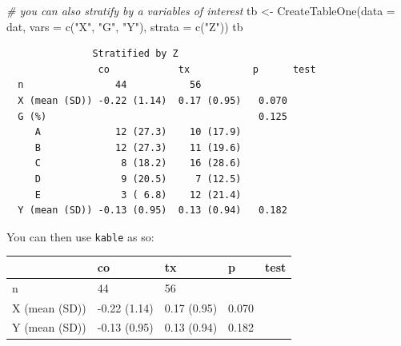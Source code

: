 \documentclass[
  letterpaper,
  DIV=11,
  numbers=noendperiod]{scrreprt}
\newenvironment{Shaded}{\begin{snugshade}}{\end{snugshade}}
\newcommand{\AttributeTok}[1]{\textcolor[rgb]{0.49,0.56,0.16}{#1}}
\newcommand{\CommentTok}[1]{\textcolor[rgb]{0.38,0.63,0.69}{\textit{#1}}}
\newcommand{\ConstantTok}[1]{\textcolor[rgb]{0.53,0.00,0.00}{#1}}
\newcommand{\FunctionTok}[1]{\textcolor[rgb]{0.02,0.16,0.49}{#1}}
\newcommand{\NormalTok}[1]{\textcolor[rgb]{0.00,0.44,0.13}{#1}}
\newcommand{\OtherTok}[1]{\textcolor[rgb]{0.00,0.44,0.13}{#1}}
\newcommand{\SpecialCharTok}[1]{\textcolor[rgb]{0.25,0.44,0.63}{#1}}
\newcommand{\StringTok}[1]{\textcolor[rgb]{0.25,0.44,0.63}{#1}}
\begin{document}
\begin{Shaded}
\begin{Highlighting}[]
\CommentTok{\# you can also stratify by a variables of interest}
\NormalTok{tb }\OtherTok{\textless{}{-}} \FunctionTok{CreateTableOne}\NormalTok{(}\AttributeTok{data =}\NormalTok{ dat,}
                     \AttributeTok{vars =} \FunctionTok{c}\NormalTok{(}\StringTok{"X"}\NormalTok{, }\StringTok{"G"}\NormalTok{, }\StringTok{"Y"}\NormalTok{), }
                     \AttributeTok{strata =} \FunctionTok{c}\NormalTok{(}\StringTok{"Z"}\NormalTok{))}
\NormalTok{tb}
\end{Highlighting}
\end{Shaded}

\begin{verbatim}
               Stratified by Z
                co            tx           p      test
  n                44           56                    
  X (mean (SD)) -0.22 (1.14)  0.17 (0.95)   0.070     
  G (%)                                     0.125     
     A             12 (27.3)    10 (17.9)             
     B             12 (27.3)    11 (19.6)             
     C              8 (18.2)    16 (28.6)             
     D              9 (20.5)     7 (12.5)             
     E              3 ( 6.8)    12 (21.4)             
  Y (mean (SD)) -0.13 (0.95)  0.13 (0.94)   0.182     
\end{verbatim}

You can then use \texttt{kable} as so:

\begin{Shaded}
\end{Shaded}

\begin{longtable}[]{@{}lllll@{}}
\toprule\noalign{}
& co & tx & p & test \\
\midrule\noalign{}
\endhead
\bottomrule\noalign{}
\endlastfoot
n & 44 & 56 & & \\
X (mean (SD)) & -0.22 (1.14) & 0.17 (0.95) & 0.070 & \\
Y (mean (SD)) & -0.13 (0.95) & 0.13 (0.94) & 0.182 & \\
\end{longtable}
\end{document}
